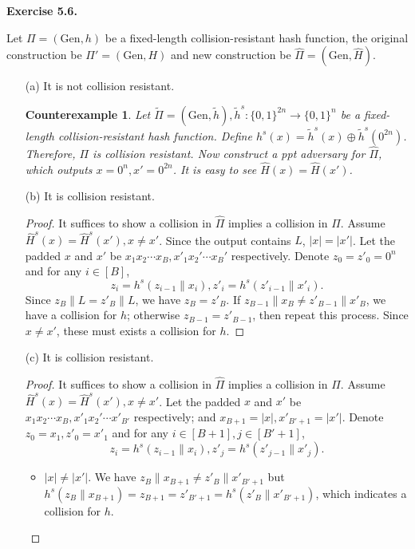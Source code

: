 \documentclass[a4paper]{article}
\newtheorem*{proof}{Proof}
\newtheorem*{counterexample}{Counterexample}
\newenvironment{exercise}[1]{
	\par
	\noindent\textbf{Exercise #1.}\quad
}{
	\par
	\bigskip
}
\newcommand{\bin}{\{0,1\}}
\newcommand{\Gen}{\mathrm{Gen}}
\newcommand{\ppt}{{\sc ppt} }
\begin{document}
\begin{exercise}{5.6}
    Let $\Pi=(\Gen,h)$ be a fixed-length collision-resistant hash function,
    the original construction be $\Pi'=(\Gen,H)$ and new construction be $\widehat\Pi=(\Gen,\hat H)$.
\begin{enumerate}
    \item[(a)] It is not collision resistant.
        \begin{counterexample}
            Let $\widetilde\Pi=(\Gen,\tilde h),\tilde h^s:\bin^{2n}\to\bin^{n}$ 
            be a fixed-length collision-resistant hash function.
            Define $h^s(x)=\tilde h^s(x)\oplus\tilde h^s(0^{2n})$. Therefore, $\Pi$ is collision resistant.
            Now construct a \ppt adversary for $\widehat\Pi$, which outputs $x=0^{n},x'=0^{2n}$. 
            It is easy to see $\hat H(x)=\hat H(x')$.
        \end{counterexample}
    \item[(b)] It is collision resistant.
        \begin{proof}
            It suffices to show a collision in $\widehat\Pi$ implies a collision in $\Pi$.
            Assume $\hat H^s(x)=\hat H^s(x'),x\neq x'$. Since the output contains $L$, $|x|=|x'|$.
            Let the padded $x$ and $x'$ be $x_1x_2\cdots x_B,x'_1x_2'\cdots x_B'$ respectively. 
            Denote $z_0=z'_0=0^n$ and for any $i\in[B]$,
            $$z_i=h^s(z_{i-1}\|x_i),z'_i=h^s(z'_{i-1}\|x'_i).$$
            Since $z_B\|L=z'_B\|L$, we have $z_B=z'_B$.
            If $z_{B-1}\|x_B\neq z'_{B-1}\|x'_B$, we have a collision for $h$;
            otherwise $z_{B-1}=z'_{B-1}$, then repeat this process.
            Since $x\neq x'$, these must exists a collision for $h$.
        \end{proof}
    \item[(c)] It is collision resistant.
        \begin{proof}
            It suffices to show a collision in $\widehat\Pi$ implies a collision in $\Pi$.
            Assume $\hat H^s(x)=\hat H^s(x'),x\neq x'$. 
            Let the padded $x$ and $x'$ be $x_1x_2\cdots x_B,x'_1x_2'\cdots x'_{B'}$ respectively;
            and $x_{B+1}=|x|,x'_{B'+1}=|x'|$. 
            Denote $z_0=x_1,z'_0=x'_1$ and for any $i\in[B+1],j\in[B'+1]$,
            $$z_i=h^s(z_{i-1}\|x_i),z'_j=h^s(z'_{j-1}\|x'_j).$$
            \begin{itemize}
                \item $|x|\neq|x'|$. We have $z_{B}\|x_{B+1}\neq z'_{B}\|x'_{B'+1}$ but
                    $h^s(z_{B}\|x_{B+1})=z_{B+1}=z'_{B'+1}=h^s(z'_{B}\|x'_{B'+1})$, which indicates a collision for $h$.

\end{itemize}
\end{proof}
\end{enumerate}
\end{exercise}
\end{document}
